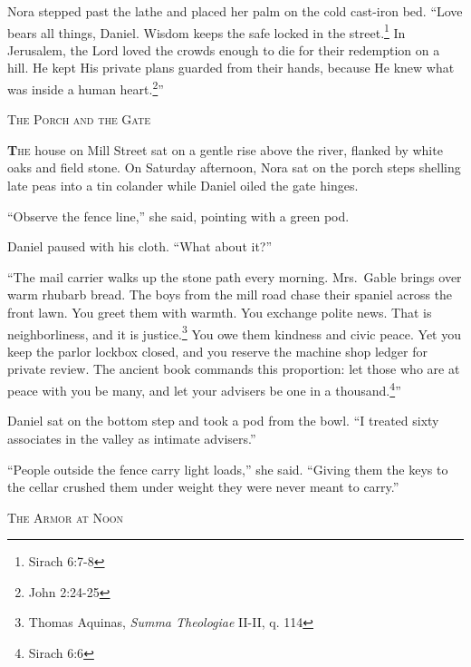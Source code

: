 \documentclass[11pt]{article}
\begin{document}
Nora stepped past the lathe and placed her palm on the cold cast-iron bed. ``Love bears all things, Daniel. Wisdom keeps the safe locked in the street.\footnote{Sirach 6:7-8} In Jerusalem, the Lord loved the crowds enough to die for their redemption on a hill. He kept His private plans guarded from their hands, because He knew what was inside a human heart.\footnote{John 2:24-25}''

\newpage

\begin{center}
    {\scshape\large The Porch and the Gate}\par
    \vspace{0.2in}
\end{center}

\lettrine[lines=3,findent=3pt,nindent=0pt]{\textbf{T}}{he} house on Mill Street sat on a gentle rise above the river, flanked by white oaks and field stone. On Saturday afternoon, Nora sat on the porch steps shelling late peas into a tin colander while Daniel oiled the gate hinges.

``Observe the fence line,'' she said, pointing with a green pod.

Daniel paused with his cloth. ``What about it?''

``The mail carrier walks up the stone path every morning. Mrs.~Gable brings over warm rhubarb bread. The boys from the mill road chase their spaniel across the front lawn. You greet them with warmth. You exchange polite news. That is neighborliness, and it is justice.\footnote{Thomas Aquinas, \textit{Summa Theologiae} II-II, q. 114} You owe them kindness and civic peace. Yet you keep the parlor lockbox closed, and you reserve the machine shop ledger for private review. The ancient book commands this proportion: let those who are at peace with you be many, and let your advisers be one in a thousand.\footnote{Sirach 6:6}''

Daniel sat on the bottom step and took a pod from the bowl. ``I treated sixty associates in the valley as intimate advisers.''

``People outside the fence carry light loads,'' she said. ``Giving them the keys to the cellar crushed them under weight they were never meant to carry.''

\newpage

\begin{center}
    {\scshape\large The Armor at Noon}\par
    \vspace{0.2in}
\end{center}
\end{document}
